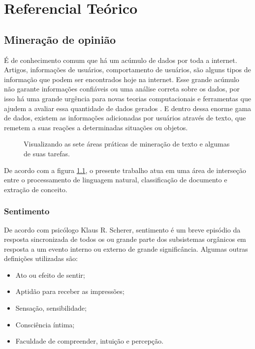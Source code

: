 \chapter{Referencial Teórico}\label{cap:referencial_teorico}

\section{Mineração de opinião}\label{sec:mineracao_dados}

É de conhecimento comum que há um acúmulo de dados por toda a internet. Artigos, informações de usuários, comportamento de usuários, são alguns tipos de informação que podem ser encontrados hoje na internet. Esse grande acúmulo não garante informações confiáveis ou uma análise correta sobre os dados, por isso há uma grande urgência para novas teorias computacionais e ferramentas que ajudem a avaliar essa quantidade de dados gerados \cite{fayyad1996data}. E dentro dessa enorme gama de dados, existem as informações adicionadas por usuários através de texto, que remetem a suas reações a determinadas situações ou objetos.

\begin{figure}[H]
	\centering{}
	\caption{Visualizando as sete áreas práticas de mineração de texto e algumas de suas tarefas. \cite{miner2012practical} }
	\label{venn}
\end{figure}

De acordo com a figura \ref{venn}, o presente trabalho atua em uma área de interseção entre o processamento de linguagem natural, classificação de documento e extração de conceito.

\subsection{Sentimento}
De acordo com psicólogo Klaus R. Scherer, sentimento é um breve episódio da resposta sincronizada de todos os ou grande parte dos subsistemas orgânicos em resposta a um evento interno ou externo de grande significância\cite{scherer2001emotional}. Algumas outras definições utilizadas são:
\begin{itemize}
	\item Ato ou efeito de sentir;
	\item Aptidão para receber as impressões;
	\item Sensação, sensibilidade;
	\item Consciência íntima;
	\item Faculdade de compreender, intuição e percepção.
\end{itemize}

